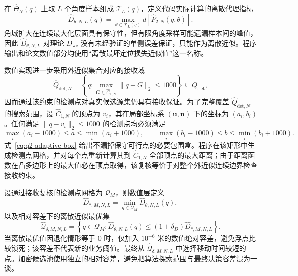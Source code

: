 在 $\widehat\Theta_N(q)$ 上取 $L$ 个角度样本组成 $\mathcal T_L(q)$，定义代码实际计算的离散代理指标
\begin{equation}
  \widehat D_{\theta,N,L}(q)
  =\max_{\theta\in\mathcal T_L(q)}
  d\left[\widehat P_{2,N}(q,\theta)\right].
  \label{eq:q2-angle-sampled-loss}
\end{equation}
角域扩大在连续最大化层面具有保守性，但有限角度采样可能遗漏样本间的峰值，因此 $\widehat D_{\theta,N,L}$ 对理论 $D_{\mathrm{wc}}$ 没有未经验证的单侧误差保证，只能作为离散近似。程序输出和论文数值部分均使用“离散最坏定位损失近似值”这一名称。

数值实现进一步采用外近似集合对应的接收域
\[
  \widehat Q_{\mathrm{det},N}
  =\left\{q:\max_{G\in\widehat C_{1,N}}\|q-G\|_2\leq1000\right\}
  \subseteq Q_{\mathrm{det}},
\]
因而通过该约束的检测点对真实候选源集仍具有接收保证。为了完整覆盖 $\widehat Q_{\mathrm{det},N}$ 的搜索范围，设 $\widehat C_{1,N}$ 的顶点为 $v_i$，其在局部坐标系 $(\mathbf u,\mathbf n)$ 下的坐标为 $(a_i,b_i)$。任何满足 $\|q-v_i\|_2\leq1000$ 的检测点均必须满足
\begin{equation}
  \max_i(a_i-1000)\leq a\leq\min_i(a_i+1000),\qquad
  \max_i(b_i-1000)\leq b\leq\min_i(b_i+1000).
  \label{eq:q2-adaptive-box}
\end{equation}
式~\eqref{eq:q2-adaptive-box} 给出不漏掉保守可行点的必要包围盒。程序在该矩形中生成检测点网格，并对每个点重新计算其到 $\widehat C_{1,N}$ 全部顶点的最大距离；由于距离函数在凸多边形上的最大值必在顶点取得，该复核等价于对整个外近似连续边界检查接收约束。

设通过接收复核的检测点网格为 $\mathcal Q_M$，则数值层定义
\[
  \widehat D_{*,M,N,L}
  =\min_{q\in\mathcal Q_M}\widehat D_{\theta,N,L}(q),
\]
以及相对容差下的离散近似最优集
\[
  \widehat{\mathcal Q}_{\delta,M,N,L}
  =\left\{q\in\mathcal Q_M:
  \widehat D_{\theta,N,L}(q)
  \leq(1+\delta_D)\widehat D_{*,M,N,L}\right\}.
\]
当离散最优值因退化情形等于 $0$ 时，仅加入 $10^{-6}$ 米的数值绝对容差，避免浮点比较锁死；该容差不代表新的业务阈值。最终从 $\widehat{\mathcal Q}_{\delta,M,N,L}$ 中选择移动时间较短的点。加密候选池使用独立的相对容差，避免把算法探索范围与最终决策容差混为一谈。


